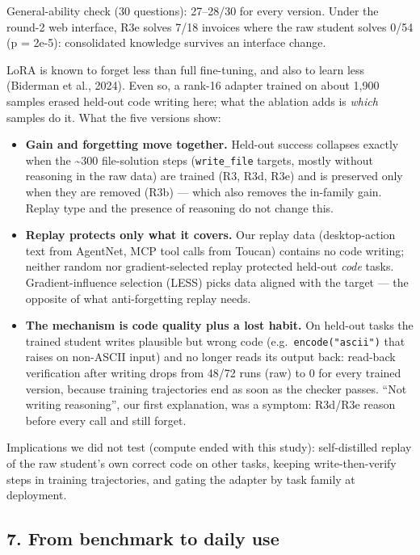 \documentclass[
  10pt,
]{article}
\providecommand{\tightlist}{%
  \setlength{\itemsep}{0pt}\setlength{\parskip}{0pt}}
\begin{document}
General-ability check (30 questions): 27--28/30 for every version. Under
the round-2 web interface, R3e solves 7/18 invoices where the raw
student solves 0/54 (p = 2e-5): consolidated knowledge survives an
interface change.

LoRA is known to forget less than full fine-tuning, and also to learn
less (Biderman et al., 2024). Even so, a rank-16 adapter trained on
about 1,900 samples erased held-out code writing here; what the ablation
adds is \emph{which} samples do it. What the five versions show:

\begin{itemize}
\tightlist
\item
  \textbf{Gain and forgetting move together.} Held-out success collapses
  exactly when the \textasciitilde300 file-solution steps
  (\texttt{write\_file} targets, mostly without reasoning in the raw
  data) are trained (R3, R3d, R3e) and is preserved only when they are
  removed (R3b) --- which also removes the in-family gain. Replay type
  and the presence of reasoning do not change this.
\item
  \textbf{Replay protects only what it covers.} Our replay data
  (desktop-action text from AgentNet, MCP tool calls from Toucan)
  contains no code writing; neither random nor gradient-selected replay
  protected held-out \emph{code} tasks. Gradient-influence selection
  (LESS) picks data aligned with the target --- the opposite of what
  anti-forgetting replay needs.
\item
  \textbf{The mechanism is code quality plus a lost habit.} On held-out
  tasks the trained student writes plausible but wrong code
  (e.g.~\texttt{encode("ascii")} that raises on non-ASCII input) and no
  longer reads its output back: read-back verification after writing
  drops from 48/72 runs (raw) to 0 for every trained version, because
  training trajectories end as soon as the checker passes. ``Not writing
  reasoning'', our first explanation, was a symptom: R3d/R3e reason
  before every call and still forget.
\end{itemize}

Implications we did not test (compute ended with this study):
self-distilled replay of the raw student's own correct code on other
tasks, keeping write-then-verify steps in training trajectories, and
gating the adapter by task family at deployment.

\subsection{7. From benchmark to daily
use}\label{from-benchmark-to-daily-use}
\end{document}
